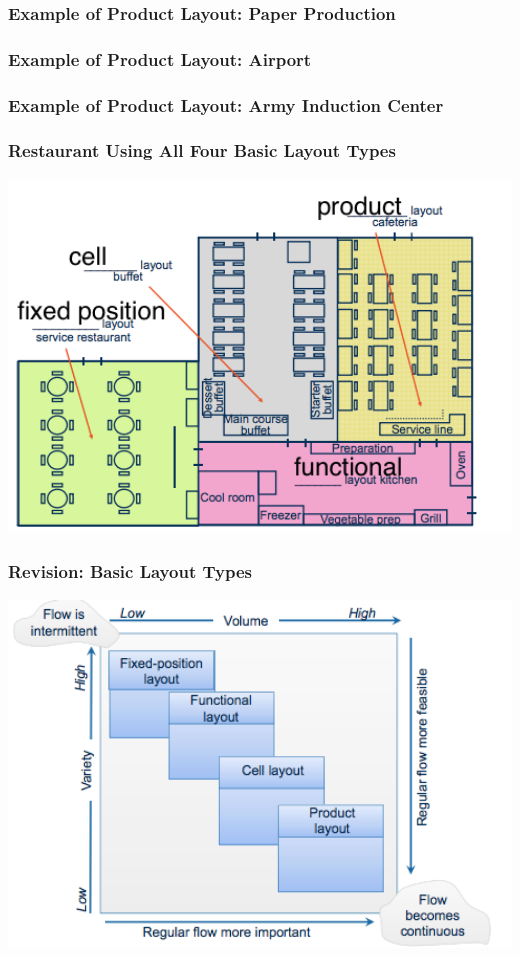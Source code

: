 \subsubsection{Example of Product Layout: Paper Production}
\subsubsection{Example of Product Layout: Airport}
\subsubsection{Example of Product Layout: Army Induction Center}
\subsubsection{Restaurant Using All Four Basic Layout Types}\label{allLayouts}
\includegraphics[width=1\textwidth]{W05/alllayouts}
\subsubsection{Revision: Basic Layout Types}
\includegraphics[width=1\textwidth]{W05/basiclayouttypesrevision}

